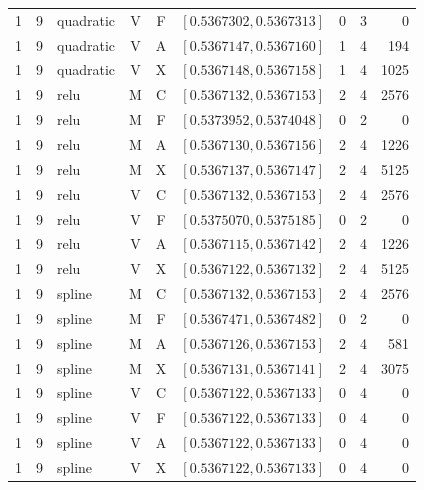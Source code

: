 \begin{longtable}{r r l c c l r r r}
1 & 9 & quadratic & V & F & $[0.5367302,0.5367313]$ & 0 & 3 & 0 \\
1 & 9 & quadratic & V & A & $[0.5367147,0.5367160]$ & 1 & 4 & 194 \\
1 & 9 & quadratic & V & X & $[0.5367148,0.5367158]$ & 1 & 4 & 1025 \\
1 & 9 & relu & M & C & $[0.5367132,0.5367153]$ & 2 & 4 & 2576 \\
1 & 9 & relu & M & F & $[0.5373952,0.5374048]$ & 0 & 2 & 0 \\
1 & 9 & relu & M & A & $[0.5367130,0.5367156]$ & 2 & 4 & 1226 \\
1 & 9 & relu & M & X & $[0.5367137,0.5367147]$ & 2 & 4 & 5125 \\
1 & 9 & relu & V & C & $[0.5367132,0.5367153]$ & 2 & 4 & 2576 \\
1 & 9 & relu & V & F & $[0.5375070,0.5375185]$ & 0 & 2 & 0 \\
1 & 9 & relu & V & A & $[0.5367115,0.5367142]$ & 2 & 4 & 1226 \\
1 & 9 & relu & V & X & $[0.5367122,0.5367132]$ & 2 & 4 & 5125 \\
1 & 9 & spline & M & C & $[0.5367132,0.5367153]$ & 2 & 4 & 2576 \\
1 & 9 & spline & M & F & $[0.5367471,0.5367482]$ & 0 & 2 & 0 \\
1 & 9 & spline & M & A & $[0.5367126,0.5367153]$ & 2 & 4 & 581 \\
1 & 9 & spline & M & X & $[0.5367131,0.5367141]$ & 2 & 4 & 3075 \\
1 & 9 & spline & V & C & $[0.5367122,0.5367133]$ & 0 & 4 & 0 \\
1 & 9 & spline & V & F & $[0.5367122,0.5367133]$ & 0 & 4 & 0 \\
1 & 9 & spline & V & A & $[0.5367122,0.5367133]$ & 0 & 4 & 0 \\
1 & 9 & spline & V & X & $[0.5367122,0.5367133]$ & 0 & 4 & 0 \\
\hline\end{longtable}\endgroup
